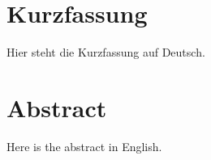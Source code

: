 \documentclass[12pt,a4paper]{report}
\renewcommand{\headrulewidth}{0pt} %
\begin{document}


\pagestyle{plain}






\newpage
{}
\section*{Kurzfassung}
Hier steht die Kurzfassung auf Deutsch.

\section*{Abstract}
Here is the abstract in English.

\newpage
{}

\pagestyle{fancy}  %
\setcounter{section}{0}

\pagestyle{fancy}  %
\fancyhead[L]{\nouppercase{\rightmark}} %
\renewcommand{\headrulewidth}{0.4pt}  %
\end{document}
